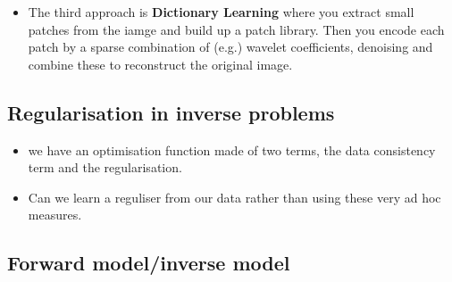 \documentclass[11pt]{article}
\begin{document}
\begin{itemize}
    \item The third approach is \textbf{Dictionary Learning} where you extract small patches from the iamge and build up a patch library. Then you encode each patch by a sparse combination of (e.g.) wavelet coefficients, denoising and combine these to reconstruct the original image.
\end{itemize}

\subsection{Regularisation in inverse problems}

\begin{minipage}[l]{.5\linewidth}
    \begin{figure}[H]
        \centering
        
    \end{figure}    
\end{minipage}\hfill
\begin{minipage}[r]{.48\linewidth}
    \begin{itemize}
        \item we have an optimisation function made of two terms, the data consistency term and the regularisation.
        \item Can we learn a reguliser from our data rather than using these very ad hoc measures. 
    \end{itemize}
\end{minipage}

\subsection{Forward model/inverse model}

\begin{figure}[H]
    \centering
\end{figure}    
\end{document}
